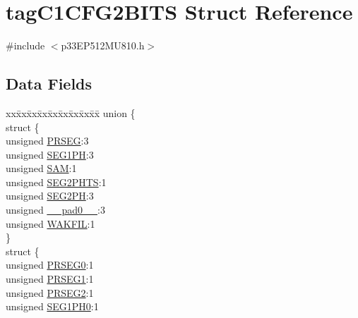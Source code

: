 \hypertarget{structtag_c1_c_f_g2_b_i_t_s}{}\section{tag\+C1\+C\+F\+G2\+B\+I\+TS Struct Reference}
\label{structtag_c1_c_f_g2_b_i_t_s}


{\ttfamily \#include $<$p33\+E\+P512\+M\+U810.\+h$>$}

\subsection*{Data Fields}
\begin{DoxyCompactItemize}
\item 
\begin{tabbing}
xx\=xx\=xx\=xx\=xx\=xx\=xx\=xx\=xx\=\kill
union \{\\
\>struct \{\\
\>\>unsigned \hyperlink{structtag_c1_c_f_g2_b_i_t_s_aed75d8496282b61652960c680350ff55}{PRSEG}:3\\
\>\>unsigned \hyperlink{structtag_c1_c_f_g2_b_i_t_s_a66537deae4c95d3bbd786589e5391a4b}{SEG1PH}:3\\
\>\>unsigned \hyperlink{structtag_c1_c_f_g2_b_i_t_s_ae942ba302f30fe2ccd228a45f4f00b49}{SAM}:1\\
\>\>unsigned \hyperlink{structtag_c1_c_f_g2_b_i_t_s_a0bd61bcd1dc93d00c31bbf91cd4122cd}{SEG2PHTS}:1\\
\>\>unsigned \hyperlink{structtag_c1_c_f_g2_b_i_t_s_a2760cd4cc40dd951a3551da71599d809}{SEG2PH}:3\\
\>\>unsigned \hyperlink{structtag_c1_c_f_g2_b_i_t_s_adf71f3d8410c1f1dbbc96680a92c49af}{\_\_pad0\_\_}:3\\
\>\>unsigned \hyperlink{structtag_c1_c_f_g2_b_i_t_s_ab2a0670f9689af2dafc7a8239d64d820}{WAKFIL}:1\\
\>\} \\
\>struct \{\\
\>\>unsigned \hyperlink{structtag_c1_c_f_g2_b_i_t_s_aed226a365a3ab64105e9895c6768e7ec}{PRSEG0}:1\\
\>\>unsigned \hyperlink{structtag_c1_c_f_g2_b_i_t_s_a65a18874577960c4f0e43639e0762bf0}{PRSEG1}:1\\
\>\>unsigned \hyperlink{structtag_c1_c_f_g2_b_i_t_s_afb4a89e1952acf8b5e4bdab99f1087a1}{PRSEG2}:1\\
\>\>unsigned \hyperlink{structtag_c1_c_f_g2_b_i_t_s_a80c86c03e1bfa095a911a2fd38524296}{SEG1PH0}:1\\

\end{tabbing}
\end{DoxyCompactItemize}
